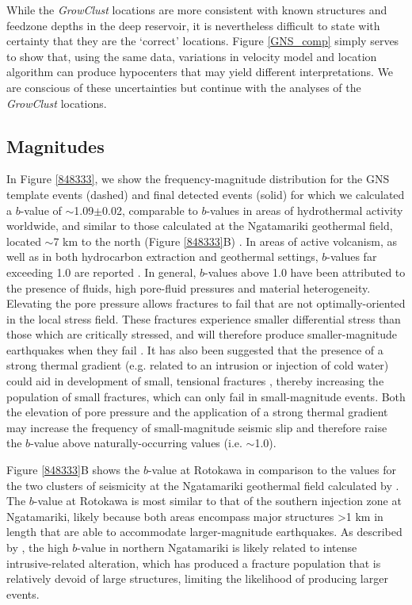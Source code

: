 While the \textit{GrowClust} locations are more consistent with known structures and \gls{feedzone} depths in the deep reservoir, it is nevertheless difficult to state with certainty that they are the `correct' locations. Figure \ref{GNS_comp} simply serves to show that, using the same data, variations in velocity model and location algorithm can produce hypocenters that may yield different interpretations. We are conscious of these uncertainties but continue with the analyses of the \textit{GrowClust} locations.

\subsection{Magnitudes}
In Figure \ref{848333}, we show the frequency-magnitude distribution for the GNS template events (dashed) and final detected events (solid) for which we calculated a $b$-value of $\sim${1.09}$\pm$0.02, comparable to $b$-values in areas of hydrothermal activity worldwide, and similar to those calculated at the Ngatamariki geothermal field, located $\sim${7} km to the north (Figure \ref{848333}B) \citep[e.g.][]{Bachmann_2012,Wiemer_1997,Dinske_2012,j2019}. In areas of active volcanism, as well as in both hydrocarbon extraction and geothermal settings, $b$-values far exceeding 1.0 are reported  \citep{Dinske_2012,Shapiro_2011}. In general, $b$-values above 1.0 have been attributed to the presence of fluids, high pore-fluid pressures and material heterogeneity. Elevating the pore pressure allows fractures to fail that are not optimally-oriented in the local stress field. These fractures experience smaller differential stress than those which are critically stressed, and will therefore produce smaller-magnitude earthquakes when they fail \citep{Bachmann_2012}. It has also been suggested that the presence of a strong thermal gradient (e.g. related to an intrusion or injection of cold water) could aid in development of small, tensional fractures \citep{Warren_1970}, thereby increasing the population of small fractures, which can only fail in small-magnitude events. Both the elevation of pore pressure and the application of a strong thermal gradient may increase the frequency of small-magnitude seismic slip and therefore raise the $b$-value above naturally-occurring values (i.e. $\sim$1.0).

Figure \ref{848333}B shows the $b$-value at Rotokawa in comparison to the values for the two clusters of seismicity at the Ngatamariki geothermal field calculated by \citet{j2019}. The $b$-value at Rotokawa is most similar to that of the southern injection zone at Ngatamariki, likely because both areas encompass major structures \textgreater1 km in length that are able to accommodate larger-magnitude earthquakes. As described by \citet{j2019}, the high $b$-value in northern Ngatamariki is likely related to intense intrusive-related alteration, which has produced a fracture population that is relatively devoid of large structures, limiting the likelihood of producing larger events.

